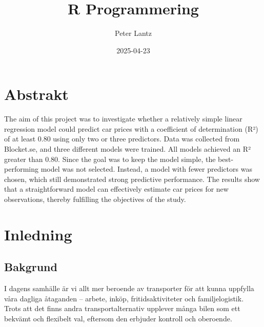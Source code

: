 \documentclass[
  letterpaper,
  DIV=11,
  numbers=noendperiod]{scrreprt}
\title{R Programmering}
\author{Peter Lantz}
\date{2025-04-23}
\renewcommand*\contentsname{Innehållsförteckning}
\newcommand\contentsname{Innehållsförteckning}
\begin{document}
\maketitle

\renewcommand*\contentsname{Innehållsförteckning}
{
\hypersetup{linkcolor=}
\setcounter{tocdepth}{2}
\tableofcontents
}


\chapter*{}\label{section}

\markboth{}{}


\chapter*{Abstrakt}\label{abstrakt}


The aim of this project was to investigate whether a relatively simple
linear regression model could predict car prices with a coefficient of
determination (R²) of at least 0.80 using only two or three predictors.
Data was collected from Blocket.se, and three different models were
trained. All models achieved an R² greater than 0.80. Since the goal was
to keep the model simple, the best-performing model was not selected.
Instead, a model with fewer predictors was chosen, which still
demonstrated strong predictive performance. The results show that a
straightforward model can effectively estimate car prices for new
observations, thereby fulfilling the objectives of the study.


\chapter{Inledning}\label{inledning}


\section{Bakgrund}\label{bakgrund}

I dagens samhälle är vi allt mer beroende av transporter för att kunna
uppfylla våra dagliga åtaganden -- arbete, inköp, fritidsaktiviteter och
familjelogistik. Trots att det finns andra transportalternativ upplever
många bilen som ett bekvämt och flexibelt val, eftersom den erbjuder
kontroll och oberoende.
\end{document}
